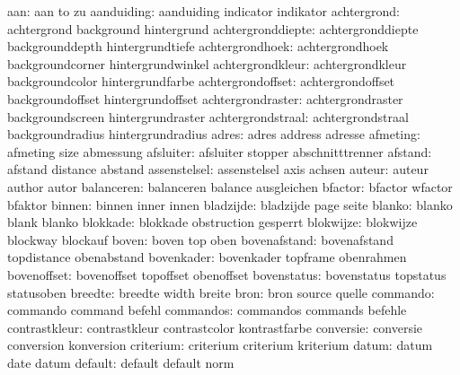                aan:  aan                  to                  zu
         aanduiding:  aanduiding           indicator           indikator
        achtergrond:  achtergrond          background          hintergrund
  achtergronddiepte:  achtergronddiepte    backgrounddepth     hintergrundtiefe
    achtergrondhoek:  achtergrondhoek      backgroundcorner    hintergrundwinkel
   achtergrondkleur:  achtergrondkleur     backgroundcolor     hintergrundfarbe
  achtergrondoffset:  achtergrondoffset    backgroundoffset    hintergrundoffset
  achtergrondraster:  achtergrondraster    backgroundscreen    hintergrundraster
  achtergrondstraal:  achtergrondstraal    backgroundradius    hintergrundradius
              adres:  adres                address             adresse
           afmeting:  afmeting             size                abmessung
          afsluiter:  afsluiter            stopper             abschnitttrenner
            afstand:  afstand              distance            abstand
       assenstelsel:  assenstelsel         axis                achsen
             auteur:  auteur               author              autor
         balanceren:  balanceren           balance             ausgleichen
            bfactor:  bfactor              wfactor             bfaktor
             binnen:  binnen               inner               innen
          bladzijde:  bladzijde            page                seite
             blanko:  blanko               blank               blanko
           blokkade:  blokkade             obstruction         gesperrt
          blokwijze:  blokwijze            blockway            blockauf
              boven:  boven                top                 oben
       bovenafstand:  bovenafstand         topdistance         obenabstand
         bovenkader:  bovenkader           topframe            obenrahmen
        bovenoffset:  bovenoffset          topoffset           obenoffset
        bovenstatus:  bovenstatus          topstatus           statusoben
            breedte:  breedte              width               breite
               bron:  bron                 source              quelle
           commando:  commando             command             befehl
          commandos:  commandos            commands            befehle
      contrastkleur:  contrastkleur        contrastcolor       kontrastfarbe
          conversie:  conversie            conversion          konversion
          criterium:  criterium            criterium           kriterium
              datum:  datum                date                datum
            default:  default              default             norm
